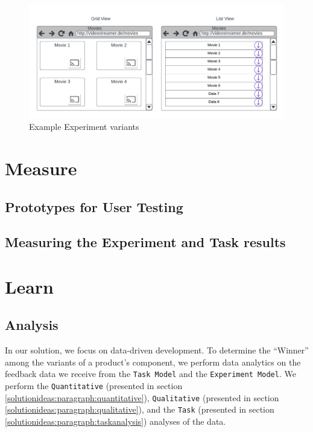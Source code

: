 \begin{figure}[ht]
	\centering
  \includegraphics[width=1.0\textwidth]{images/solution-ideas/Experimentvariants.png}
	\caption{Example Experiment variants}
	\label{solutionideas:fig:experimentingvariants}
\end{figure}

\section{Measure}
\subsection{Prototypes for User Testing}
\subsection{Measuring the Experiment and Task results}
\section{Learn}
\subsection{Analysis}
\label{solutionideas:section:dataanalysis}

In our solution, we focus on data-driven development. 
To determine the ``Winner'' among the variants of a product's component, we perform data analytics on the feedback data we receive from the \texttt{Task Model} and the \texttt{Experiment Model}.
We perform the \texttt{Quantitative} (presented in section \ref{solutionideas:paragraph:quantitative}), \texttt{Qualitative} (presented in section \ref{solutionideas:paragraph:qualitative}), and the \texttt{Task} (presented in section \ref{solutionideas:paragraph:taskanalysis}) analyses of the data.


